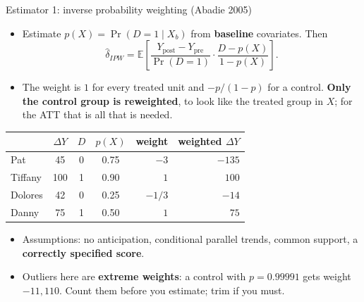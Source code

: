 \documentclass[
  11pt,
  ignorenonframetext,
  aspectratio=169,
]{beamer}
\providecommand{\tightlist}{%
  \setlength{\itemsep}{0pt}\setlength{\parskip}{0pt}}
\begin{document}
\begin{frame}{Estimator 1: inverse probability weighting (Abadie 2005)}
\protect{}\label{estimator-1-inverse-probability-weighting-abadie-2005}
\begin{itemize}
\tightlist
\item
  Estimate \(p(X) = \Pr(D=1 \mid X_b)\) from \textbf{baseline}
  covariates. Then \[
  \hat\delta_{IPW} = \mathbb{E}\!\left[\frac{Y_{\text{post}} - Y_{\text{pre}}}{\Pr(D=1)} \cdot \frac{D - p(X)}{1 - p(X)}\right].
  \]
\item
  The weight is \(1\) for every treated unit and \(-p/(1-p)\) for a
  control. \textbf{Only the control group is reweighted}, to look like
  the treated group in \(X\); for the ATT that is all that is needed.
\end{itemize}

\begin{center}\scriptsize
\begin{tabular}{lcccrr}
\toprule
 & $\Delta Y$ & $D$ & $p(X)$ & weight & weighted $\Delta Y$ \\
\midrule
Pat & 45 & 0 & 0.75 & $-3$ & $-135$ \\
Tiffany & 100 & 1 & 0.90 & $1$ & $100$ \\
Dolores & 42 & 0 & 0.25 & $-1/3$ & $-14$ \\
Danny & 75 & 1 & 0.50 & $1$ & $75$ \\
\bottomrule
\end{tabular}
\end{center}

\begin{itemize}
\tightlist
\item
  Assumptions: no anticipation, conditional parallel trends, common
  support, a \textbf{correctly specified score}.
\item
  Outliers here are \textbf{extreme weights}: a control with
  \(p = 0.99991\) gets weight \(-11{,}110\). Count them before you
  estimate; trim if you must.
\end{itemize}
\end{frame}
\end{document}
